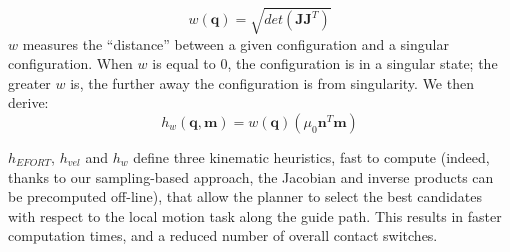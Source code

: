 \begin{equation*} \label{ellipsoid}
w(\mathbf{q}) = \sqrt{det(\mathbf{J}\mathbf{J}^T)}
\end{equation*}
$w$ measures the ``distance'' between a given configuration and a singular configuration. When $w$ is equal to 0, the configuration is in a singular state;
the greater $w$ is, the further away the configuration is from singularity.
We then derive:
\begin{equation}
h_{w}(\mathbf{q}, \mathbf{m}) = w(\mathbf{q})  (\mu_0 \mathbf{n}^T \mathbf{m})
\end{equation}

$h_{EFORT}$, $h_{vel}$ and $h_{w}$ define three kinematic heuristics, fast to compute (indeed, thanks to our sampling-based approach, the Jacobian and inverse products
can be precomputed off-line), that allow the planner to select the best
candidates with respect to the local motion task along the guide path.
This results in faster computation times, and a reduced number of overall contact switches.



